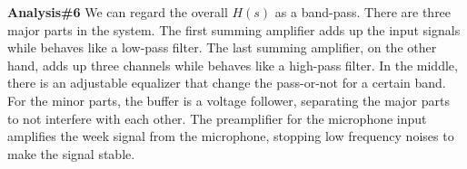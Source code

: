 \hfill \newline
\textbf{Analysis\#6} \newline
\phantom{ } We can regard the overall $H(s)$ as a band-pass. There are three major parts in the system. The first summing amplifier adds up the input signals while behaves like a low-pass filter. The last summing amplifier, on the other hand, adds up three channels while behaves like a high-pass filter. In the middle, there is an adjustable equalizer that change the pass-or-not for a certain band. For the minor parts, the buffer is a voltage follower, separating the major parts to not interfere with each other. The preamplifier for the microphone input amplifies the week signal from the microphone, stopping low frequency noises to make the signal stable.  